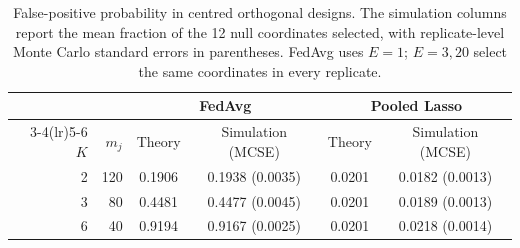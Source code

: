 \begin{table}[htbp]
\centering\small
\caption{False-positive probability in centred orthogonal designs. The simulation columns report the mean fraction of the 12 null coordinates selected, with replicate-level Monte Carlo standard errors in parentheses. FedAvg uses $E=1$; $E=3,20$ select the same coordinates in every replicate.}
\label{tab:orthogonal-check}
\begin{tabular}{rrcccc}
\toprule
& & \multicolumn{2}{c}{FedAvg} & \multicolumn{2}{c}{Pooled Lasso} \\
\cmidrule(lr){3-4}\cmidrule(lr){5-6}
$K$ & $m_j$ & Theory & Simulation (MCSE) & Theory & Simulation (MCSE) \\
\midrule
2 & 120 & 0.1906 & 0.1938 (0.0035) & 0.0201 & 0.0182 (0.0013) \\
3 & 80 & 0.4481 & 0.4477 (0.0045) & 0.0201 & 0.0189 (0.0013) \\
6 & 40 & 0.9194 & 0.9167 (0.0025) & 0.0201 & 0.0218 (0.0014) \\
\bottomrule
\end{tabular}
\end{table}
